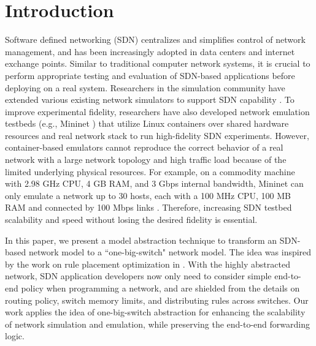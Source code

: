 \section{Introduction}


Software defined networking (SDN) centralizes and simplifies control of network management, and has been increasingly adopted in data centers and internet exchange points\cite{B4, Meridian, SDX}.
Similar to traditional computer network systems, it is crucial to perform appropriate testing and evaluation of SDN-based applications before deploying on a real system.
Researchers in the simulation community have extended various existing network simulators to support SDN capability \cite{S3F, NS3, OPNET}.
To improve experimental fidelity, researchers have also developed network emulation testbeds
(e.g., Mininet \cite{Mininet}) that utilize Linux containers over shared hardware resources and
real network stack to run high-fidelity SDN experiments.
However, container-based emulators cannot reproduce the correct behavior of a real network
with a large network topology and high traffic load because of the limited underlying physical resources.
For example, on a commodity machine with 2.98 GHz CPU, 4 GB RAM, and 3 Gbps internal bandwidth,
Mininet can only emulate a network up to 30 hosts, each with a 100 MHz CPU, 100 MB RAM and connected by 100 Mbps links \cite{ReproNetExprCBE}.
Therefore, increasing SDN testbed scalability and speed without losing the desired fidelity is essential.


In this paper, we present a model abstraction technique to transform an SDN-based network model to a ``one-big-switch" network model.
The idea was inspired by the work on rule placement optimization in \cite{OneBigSwitchAbstraction}.
With the highly abstracted network, SDN application developers now only need to consider
simple end-to-end policy when programming a network,
and are shielded from the details on routing policy, switch memory limits,
and distributing rules across switches.
Our work applies the idea of one-big-switch abstraction for enhancing the scalability
of network simulation and emulation, while preserving the end-to-end forwarding logic.

